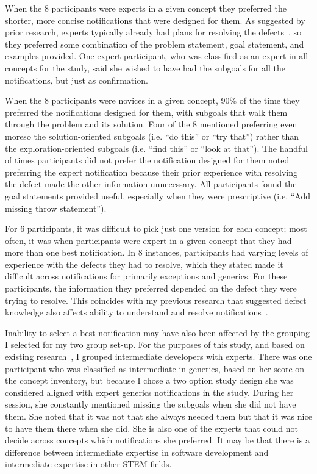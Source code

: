 When the 8 participants were experts in a given concept they preferred the shorter, more concise notifications that were designed for them.
As suggested by prior research, experts typically already had plans for resolving the defects~\cite{larkin1980expert, Wiedenbeck:1993:Mental}, so they preferred some combination of the problem statement, goal statement, and examples provided.
One expert participant, who was classified as an expert in all concepts for the study, said she wished to have had the subgoals for all the notifications, but just as confirmation.

When the 8 participants were novices in a given concept, 90\% of the time they preferred the notifications designed for them, with subgoals that walk them through the problem and its solution. 
Four of the 8 mentioned preferring even moreso the solution-oriented subgoals (i.e. ``do this'' or ``try that'') rather than the exploration-oriented subgoals (i.e. ``find this'' or ``look at that'').
The handful of times participants did not prefer the notification designed for them noted preferring the expert notification because their prior experience with resolving the defect made the other information unnecessary.
All participants found the goal statements provided useful, especially when they were prescriptive (i.e. ``Add missing throw statement'').


For 6 participants, it was difficult to pick just one version for each concept; most often, it was when participants were expert in a given concept that they had more than one best notification.
In 8 instances, participants had varying levels of experience with the defects they had to resolve, which they stated made it difficult across notifications for primarily exceptions and generics. 
For these participants, the information they preferred depended on the defect they were trying to resolve. This coincides with my previous research that suggested defect knowledge also affects ability to understand and resolve notifications~\cite{johnson2016cross}.


Inability to select a best notification may have also been affected by the grouping I selected for my two group set-up. 
For the purposes of this study, and based on existing research~\cite{mckeithen1981knowledge}, I grouped intermediate developers with experts. 
There was one participant who was classified as intermediate in generics, based on her score on the concept inventory, but because I chose a two option study design she was considered aligned with expert generics notifications in the study.
During her session, she constantly mentioned missing the subgoals when she did not have them. She noted that it was not that she always needed them but that it was nice to have them there when she did. She is also one of the experts that could not decide across concepts which notifications she preferred. 
It may be that there is a difference between intermediate expertise in software development and intermediate expertise in other STEM fields.



